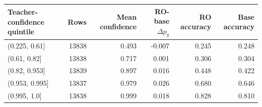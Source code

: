 \begin{tabular}{lrrrrr}
\toprule
Teacher-confidence quintile & Rows & Mean confidence & RO-base $\Delta p_y$ & RO accuracy & Base accuracy \\
\midrule
(0.225, 0.61] & 13838 & 0.493 & -0.007 & 0.245 & 0.248 \\
(0.61, 0.82] & 13838 & 0.717 & 0.001 & 0.306 & 0.304 \\
(0.82, 0.953] & 13839 & 0.897 & 0.016 & 0.448 & 0.422 \\
(0.953, 0.995] & 13837 & 0.979 & 0.026 & 0.680 & 0.646 \\
(0.995, 1.0] & 13838 & 0.999 & 0.018 & 0.828 & 0.810 \\
\bottomrule
\end{tabular}